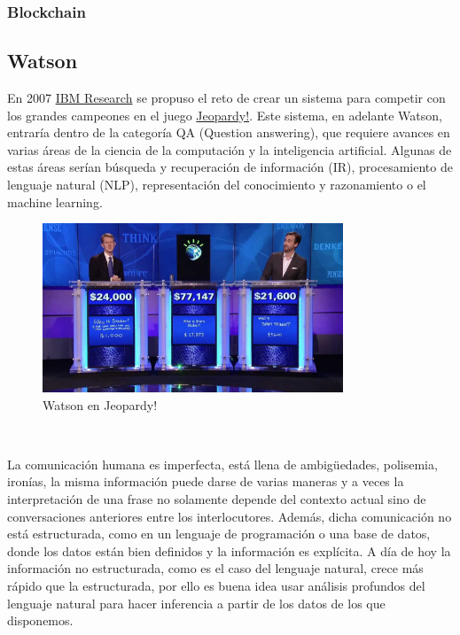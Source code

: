\documentclass[paper=a4, fontsize=10pt]{scrartcl} %
\numberwithin{equation}{section} %
\numberwithin{figure}{section} %
\numberwithin{table}{section} %
\begin{document}
\subsubsection{Blockchain}
\subsection{Watson}
En 2007 \href{https://www.research.ibm.com/}{IBM Research} se propuso el reto de crear un sistema para competir con los grandes campeones en el juego \href{https://www.jeopardy.com/}{Jeopardy!}. 
Este sistema, en adelante Watson, entraría dentro de la categoría QA (Question answering), que requiere avances en varias áreas de la ciencia de la computación y la inteligencia artificial. 
Algunas de estas áreas serían búsqueda y recuperación de información (IR), procesamiento de lenguaje natural (NLP), representación del conocimiento y razonamiento o el machine learning.

\begin{figure}[H]
	\centering
	\label{j-watson}
	\includegraphics[width=0.8\textwidth]{./Imagenes/j-watson.jpg}
	\caption{Watson en Jeopardy!}
\end{figure}

\

La comunicación humana es imperfecta, está llena de ambigüedades, polisemia, ironías, la misma información puede darse de varias maneras y a veces la interpretación de una frase no solamente depende del contexto actual sino de conversaciones anteriores entre los interlocutores.
Además, dicha comunicación no está estructurada, como en un lenguaje de programación o una base de datos, donde los datos están bien definidos y la información es explícita.
A día de hoy la información no estructurada, como es el caso del lenguaje natural, crece más rápido que la estructurada, por ello es buena idea usar análisis profundos del lenguaje natural para hacer inferencia a partir de los datos de los que disponemos.
\end{document}
